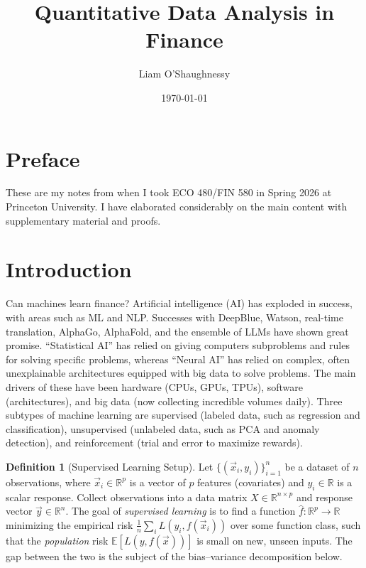 \documentclass[11pt]{article}
\title{\textbf{Quantitative Data Analysis in Finance}}
\author{Liam O'Shaughnessy}
\date{\today}
\theoremstyle{definition}
\newtheorem{definition}{Definition}[section]
\theoremstyle{plain}
\theoremstyle{remark}
\begin{document}
\maketitle
\tableofcontents
\newpage

\section*{Preface}

These are my notes from when I took ECO 480/FIN 580 in Spring 2026 at Princeton University. I have elaborated considerably on the main content with supplementary material and proofs.

\section{Introduction}

Can machines learn finance? Artificial intelligence (AI) has exploded in success, with areas such as ML and NLP. Successes with DeepBlue, Watson, real-time translation, AlphaGo, AlphaFold, and the ensemble of LLMs have shown great promise. ``Statistical AI'' has relied on giving computers subproblems and rules for solving specific problems, whereas ``Neural AI'' has relied on complex, often unexplainable architectures equipped with big data to solve problems. The main drivers of these have been hardware (CPUs, GPUs, TPUs), software (architectures), and big data (now collecting incredible volumes daily). Three subtypes of machine learning are supervised (labeled data, such as regression and classification), unsupervised (unlabeled data, such as PCA and anomaly detection), and reinforcement (trial and error to maximize rewards).

\begin{definition}[Supervised Learning Setup]
    Let $\{(\vec{x}_i, y_i)\}_{i=1}^n$ be a dataset of $n$ observations, where $\vec{x}_i \in \mathbb{R}^p$ is a vector of $p$ features (covariates) and $y_i \in \mathbb{R}$ is a scalar response. Collect observations into a data matrix $X \in \mathbb{R}^{n \times p}$ and response vector $\vec{y} \in \mathbb{R}^n$. The goal of \textit{supervised learning} is to find a function $\hat{f}: \mathbb{R}^p \to \mathbb{R}$ minimizing the empirical risk $\frac{1}{n}\sum_i L(y_i, f(\vec{x}_i))$ over some function class, such that the \emph{population} risk $\mathbb{E}[L(y,f(\vec{x}))]$ is small on new, unseen inputs. The gap between the two is the subject of the bias--variance decomposition below.
\end{definition}
\end{document}
